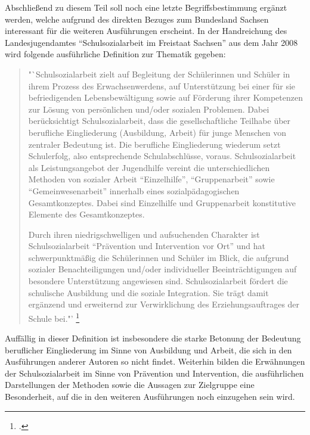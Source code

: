 Abschließend zu diesem Teil soll noch eine letzte Begriffsbestimmung ergänzt werden, welche aufgrund des direkten Bezuges zum Bundesland Sachsen interessant für die weiteren Ausführungen erscheint. In der Handreichung des Landesjugendamtes "`Schulsozialarbeit im Freistaat Sachsen"' aus dem Jahr 2008 wird folgende ausführliche Definition zur Thematik gegeben: 

\begin{quotation}
\noindent
"`Schulsozialarbeit zielt auf Begleitung der Schülerinnen und Schüler in ihrem Prozess des Erwachsenwerdens, auf Unterstützung bei einer für sie befriedigenden Lebensbewältigung sowie auf Förderung ihrer Kompetenzen zur Lösung von persönlichen und/oder sozialen Problemen. Dabei berücksichtigt Schulsozialarbeit, dass die gesellschaftliche Teilhabe über berufliche Eingliederung (Ausbildung, Arbeit) für junge Menschen von zentraler Bedeutung ist. Die berufliche Eingliederung wiederum setzt Schulerfolg, also entsprechende Schulabschlüsse, voraus. Schulsozialarbeit als Leistungsangebot der Jugendhilfe vereint die unterschiedlichen Methoden von sozialer Arbeit "`Einzelhilfe"', "`Gruppenarbeit"' sowie "`Gemeinwesenarbeit"' innerhalb eines sozialpädagogischen Gesamtkonzeptes. Dabei sind Einzelhilfe und Gruppenarbeit konstitutive Elemente des Gesamtkonzeptes.

Durch ihren niedrigschwelligen und aufsuchenden Charakter ist Schulsozialarbeit "`Prävention und Intervention vor Ort"' und hat schwerpunktmäßig die Schülerinnen und Schüler im Blick, die aufgrund sozialer Benachteiligungen und/oder individueller Beeinträchtigungen auf besondere Unterstützung angewiesen sind. Schulsozialarbeit fördert die schulische Ausbildung und die soziale Integration. Sie trägt damit ergänzend und erweiternd zur Verwirklichung des Erziehungsauftrages der Schule bei."' \footcite[10]{SMSSSL2008}
\end{quotation}

Auffällig in dieser Definition ist insbesondere die starke Betonung der Bedeutung beruflicher Eingliederung im Sinne von Ausbildung und Arbeit, die sich in den Ausführungen anderer Autoren so nicht findet. Weiterhin bilden die Erwähnungen der Schulsozialarbeit im Sinne von Prävention und Intervention, die ausführlichen Darstellungen der Methoden sowie die Aussagen zur Zielgruppe eine Besonderheit, auf die in den weiteren Ausführungen noch einzugehen sein wird. 

